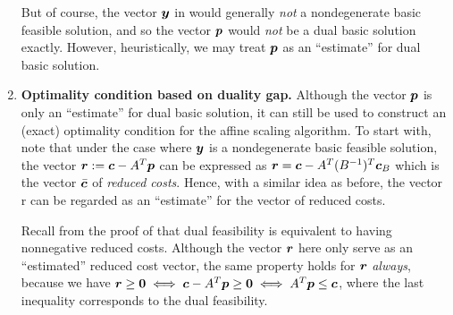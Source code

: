 \begin{enumerate}
But of course, the vector \(\bm{y}\) in 
would generally \emph{not} a nondegenerate basic feasible solution, and so the
vector \(\bm{p}\) would \emph{not} be a dual basic solution exactly.
However, heuristically, we may treat \(\bm{p}\) as an “estimate” for dual
basic solution.

\item \textbf{Optimality condition based on duality gap.} Although the vector
\(\bm{p}\) is only an “estimate” for dual basic solution, it can still be
used to construct an (exact) optimality condition for the affine scaling
algorithm. To start with, note that under the case where \(\bm{y}\) is a
nondegenerate basic feasible solution, the vector
\(\bm{r}:=\bm{c}-A^{T}\bm{p}\) can be expressed as
\(\bm{r}=\bm{c}-A^{T}(B^{-1})^{T}\bm{c}_{B}\) which is the vector
\(\bar{\bm{c}}\) of \emph{reduced costs}. Hence, with a similar idea as
before, the vector r can be regarded as an ``estimate'' for the vector of
reduced costs.

Recall from the proof of  that dual
feasibility is equivalent to having nonnegative reduced costs. Although the
vector \(\bm{r}\) here only serve as an “estimated” reduced cost vector, the
same property holds for \(\bm{r}\) \emph{always}, because we have
\(\bm{r}\ge\bm{0}\iff \bm{c}-A^{T}\bm{p}\ge\bm{0}\iff
A^{T}\bm{p}\le\bm{c}\), where the last inequality corresponds to the dual
feasibility.


\end{enumerate}
